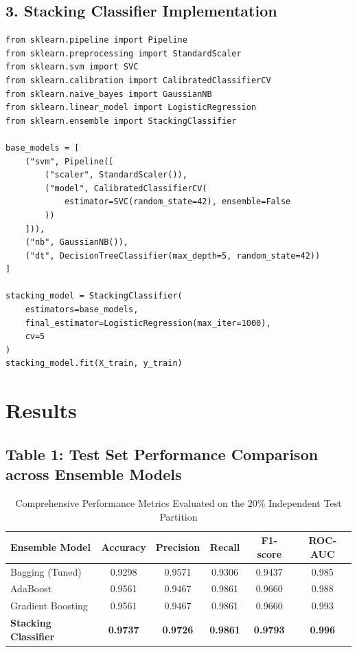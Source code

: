 \documentclass[12pt,a4paper]{article}
\begin{document}
\subsection*{3. Stacking Classifier Implementation}
\begin{lstlisting}
from sklearn.pipeline import Pipeline
from sklearn.preprocessing import StandardScaler
from sklearn.svm import SVC
from sklearn.calibration import CalibratedClassifierCV
from sklearn.naive_bayes import GaussianNB
from sklearn.linear_model import LogisticRegression
from sklearn.ensemble import StackingClassifier

base_models = [
    ("svm", Pipeline([
        ("scaler", StandardScaler()),
        ("model", CalibratedClassifierCV(
            estimator=SVC(random_state=42), ensemble=False
        ))
    ])),
    ("nb", GaussianNB()),
    ("dt", DecisionTreeClassifier(max_depth=5, random_state=42))
]

stacking_model = StackingClassifier(
    estimators=base_models,
    final_estimator=LogisticRegression(max_iter=1000),
    cv=5
)
stacking_model.fit(X_train, y_train)
\end{lstlisting}

\section{Results}

\subsection*{Table 1: Test Set Performance Comparison across Ensemble Models}

\begin{table}[H]
\centering
\begin{tabular}{lccccc}
\toprule
\textbf{Ensemble Model} & \textbf{Accuracy} & \textbf{Precision} & \textbf{Recall} & \textbf{F1-score} & \textbf{ROC-AUC} \\
\midrule
Bagging (Tuned) & 0.9298 & 0.9571 & 0.9306 & 0.9437 & 0.985 \\
AdaBoost & 0.9561 & 0.9467 & 0.9861 & 0.9660 & 0.988 \\
Gradient Boosting & 0.9561 & 0.9467 & 0.9861 & 0.9660 & 0.993 \\
\textbf{Stacking Classifier} & \textbf{0.9737} & \textbf{0.9726} & \textbf{0.9861} & \textbf{0.9793} & \textbf{0.996} \\
\bottomrule
\end{tabular}
\caption{Comprehensive Performance Metrics Evaluated on the 20\% Independent Test Partition}
\label{tab:exp6_results}
\end{table}
\end{document}
